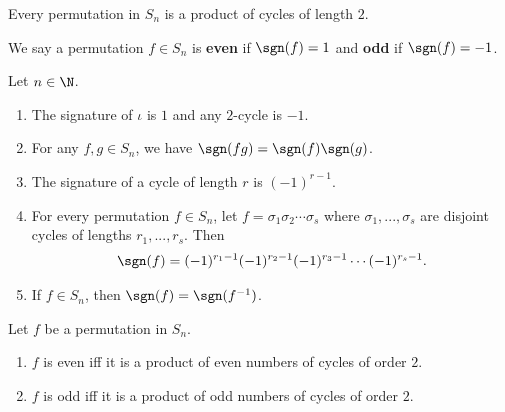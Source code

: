 \documentclass{article}
\begin{document}
\begin{lemma}
    Every permutation in $S_n$ is a product of cycles of length $2$.
\end{lemma}
\begin{definition}
    We say a permutation $f\in S_n$ is \textbf{even} if $\sgn(f)=1$ and \textbf{odd} if $\sgn(f) = -1$.
\end{definition}
\begin{lemma}
    Let $n\in\N$.
    \begin{enumerate}
        \item The signature of $\iota$ is $1$ and any $2$-cycle is $-1$.
        \item For any $f,g\in S_n$, we have $\sgn(fg)=\sgn(f)\sgn(g)$.
        \item The signature of a cycle of length $r$ is $(-1)^{r-1}$.
        \item For every permutation $f\in S_n$, let $f=\sigma_1\sigma_2\cdots \sigma_s$ where $\sigma_1,...,\sigma_s$ are disjoint cycles of lengths $r_1,...,r_s$. Then
              \begin{align*}
                  \sgn(f)=(-1)^{r_1-1}(-1)^{r_2-1}(-1)^{r_3-1}\cdots(-1)^{r_s-1}.
              \end{align*}
        \item If $f\in S_n$, then $\sgn(f)=\sgn(f^{-1})$.
    \end{enumerate}
\end{lemma}
\begin{corollary}
    Let $f$ be a permutation in $S_n$.
    \begin{enumerate}
        \item $f$ is even iff it is a product of even numbers of cycles of order $2$.
        \item $f$ is odd iff it is a product of odd numbers of cycles of order $2$.
    \end{enumerate}
\end{corollary}
\end{document}

